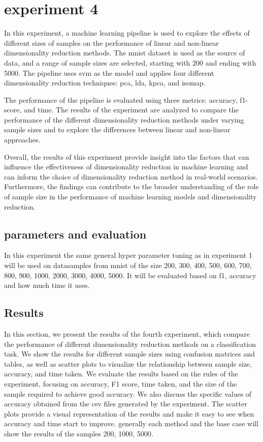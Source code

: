 \section{experiment 4}\label{sec:experiment-4}

In this experiment, a machine learning pipeline is used to explore the effects of different sizes of samples on the performance of linear and non-linear dimensionality reduction methods. The \gls{mnist} dataset is used as the source of data, and a range of sample sizes are selected, starting with 200 and ending with 5000. The pipeline uses \gls{svm} as the model and applies four different dimensionality reduction techniques: \gls{pca}, \gls{lda}, \gls{kpca}, and \gls{isomap}.

The performance of the pipeline is evaluated using three metrics: accuracy, f1-score, and time. The results of the experiment are analyzed to compare the performance of the different dimensionality reduction methods under varying sample sizes and to explore the differences between linear and non-linear approaches.

Overall, the results of this experiment provide insight into the factors that can influence the effectiveness of dimensionality reduction in machine learning and can inform the choice of dimensionality reduction method in real-world scenarios. Furthermore, the findings can contribute to the broader understanding of the role of sample size in the performance of machine learning models and dimensionality reduction.

\subsection*{parameters and evaluation}
In this experiment the same general hyper parameter tuning as in experiment 1 will be used on datasamples from \gls{mnist} of the size 200, 300, 400, 500, 600, 700, 800, 900, 1000, 2000, 3000, 4000, 5000. It will be evaluated based on f1, accuracy and how much time it uses.




\subsection{Results}\label{subsec:experiment_4_results}
In this section, we present the results of the fourth experiment, which compare the performance of different dimensionality reduction methods on a classification task. We show the results for different sample sizes using confusion matrices and tables, as well as scatter plots to visualize the relationship between sample size, accuracy, and time taken. We evaluate the results based on the rules of the experiment, focusing on accuracy, F1 score, time taken, and the size of the sample required to achieve good accuracy. We also discuss the specific values of accuracy obtained from the csv files generated by the experiment. The scatter plots provide a visual representation of the results and make it easy to see when accuracy and time start to improve. generally each method and the base case will show the results of the samples 200, 1000, 5000.

